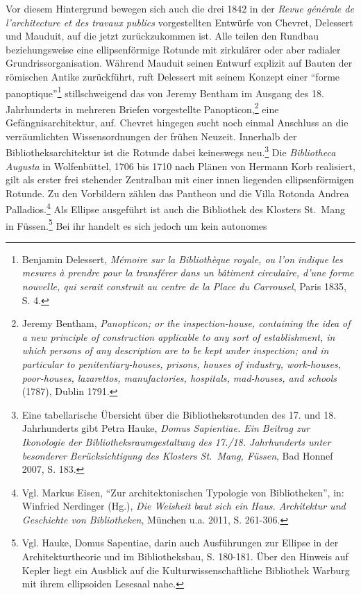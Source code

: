 Vor diesem Hintergrund bewegen sich auch die drei 1842 in der
\emph{Revue générale de l'architecture et des travaux publics}
vorgestellten Entwürfe von Chevret, Delessert und Mauduit, auf die jetzt
zurückzukommen ist. Alle teilen den Rundbau beziehungsweise eine
ellipsenförmige Rotunde mit zirkulärer oder aber radialer
Grundrissorganisation. Während Mauduit seinen Entwurf explizit auf
Bauten der römischen Antike zurückführt, ruft Delessert mit seinem
Konzept einer \enquote{forme panoptique}\footnote{Benjamin Delessert,
  \emph{Mémoire sur la Bibliothèque royale, ou l'on indique les mesures
  à prendre pour la transférer dans un bâtiment circulaire, d'une forme
  nouvelle, qui serait construit au centre de la Place du Carrousel},
  Paris 1835, S. 4.} stillschweigend das von Jeremy Bentham im Ausgang
des 18. Jahrhunderts in mehreren Briefen vorgestellte
Panopticon,\footnote{Jeremy Bentham, \emph{Panopticon; or the
  inspection-house, containing the idea of a new principle of
  construction applicable to any sort of establishment, in which persons
  of any description are to be kept under inspection; and in particular
  to penitentiary-houses, prisons, houses of industry, work-houses,
  poor-houses, lazarettos, manufactories, hospitals, mad-houses, and
  schools} (1787), Dublin 1791.} eine Gefängnisarchitektur, auf. Chevret
hingegen sucht noch einmal Anschluss an die verräumlichten
Wissensordnungen der frühen Neuzeit. Innerhalb der
Bibliotheksarchitektur ist die Rotunde dabei keineswegs neu.\footnote{Eine
  tabellarische Übersicht über die Bibliotheksrotunden des 17. und 18.
  Jahrhunderts gibt Petra Hauke, \emph{Domus Sapientiae. Ein Beitrag zur
  Ikonologie der Bibliotheksraumgestaltung des 17./18. Jahrhunderts
  unter besonderer Berücksichtigung des Klosters St.~Mang, Füssen}, Bad
  Honnef 2007, S. 183.} Die \emph{Bibliotheca Augusta} in Wolfenbüttel,
1706 bis 1710 nach Plänen von Hermann Korb realisiert, gilt als erster
frei stehender Zentralbau mit einer innen liegenden ellipsenförmigen
Rotunde. Zu den Vorbildern zählen das Pantheon und die Villa Rotonda
Andrea Palladios.\footnote{Vgl. Markus Eisen, \enquote{Zur
  architektonischen Typologie von Bibliotheken}, in: Winfried Nerdinger
  (Hg.), \emph{Die Weisheit baut sich ein Haus. Architektur und
  Geschichte von Bibliotheken}, München u.a. 2011, S. 261-306.} Als
Ellipse ausgeführt ist auch die Bibliothek des Klosters St.~Mang in
Füssen.\footnote{Vgl. Hauke, Domus Sapentiae, darin auch Ausführungen
  zur Ellipse in der Architekturtheorie und im Bibliotheksbau, S.
  180-181. Über den Hinweis auf Kepler liegt ein Ausblick auf die
  Kulturwissenschaftliche Bibliothek Warburg mit ihrem ellipsoiden
  Lesesaal nahe.} Bei ihr handelt es sich jedoch um kein autonomes
